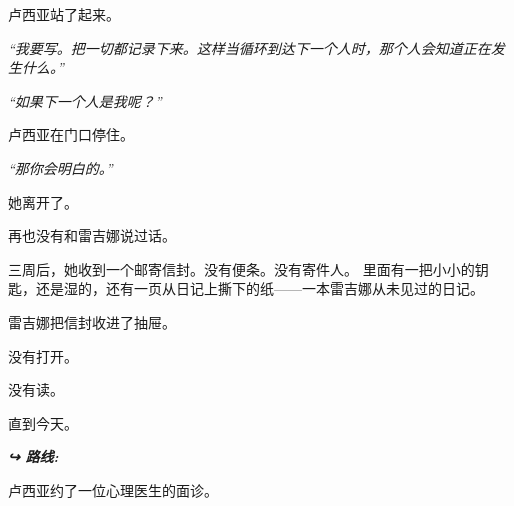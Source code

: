 \noindent 卢西亚站了起来。

\noindent \textit{\textquotedblleft{}我要写。把一切都记录下来。这样当循环到达下一个人时，那个人会知道正在发生什么。\textquotedblright{}}

\noindent \textit{\textquotedblleft{}如果下一个人是我呢？\textquotedblright{}}

\noindent 卢西亚在门口停住。

\noindent \textit{\textquotedblleft{}那你会明白的。\textquotedblright{}}

\noindent 她离开了。

\noindent 再也没有和雷吉娜说过话。

\noindent 三周后，她收到一个邮寄信封。没有便条。没有寄件人。
\noindent 里面有一把小小的钥匙，还是湿的，还有一页从日记上撕下的纸——一本雷吉娜从未见过的日记。

\noindent 雷吉娜把信封收进了抽屉。

\noindent 没有打开。

\noindent 没有读。

\noindent 直到今天。

\vspace{0.5em}
\noindent\textit{\textbf{↪ 路线:}  \rotasep {}}

\noindent 卢西亚约了一位心理医生的面诊。